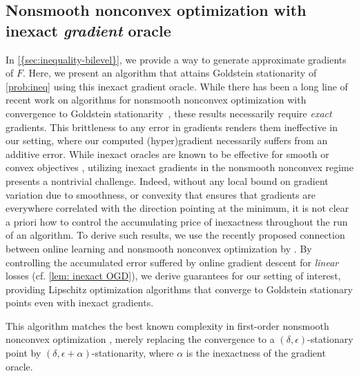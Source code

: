 \subsection{Nonsmooth nonconvex optimization with inexact \emph{gradient}  oracle}
In \cref{{sec:inequality-bilevel}}, we provide a way to generate approximate gradients of $F$. Here, we present an algorithm that attains Goldstein stationarity of \cref{prob:ineq} using this inexact gradient oracle.  While there has been a long line of recent work on algorithms for nonsmooth nonconvex optimization with convergence to Goldstein stationarity~\cite{zhang2020complexity, davis2022gradient, jordan2023deterministic, kong2023cost, grimmer2023goldstein}, these results necessarily require \textit{exact} gradients. 
This brittleness to any error in gradients renders them ineffective in our setting, where our computed (hyper)gradient necessarily suffers from an
additive error.
While inexact oracles are known to be effective for smooth or convex objectives \citep{devolder2014first}, utilizing inexact gradients in the nonsmooth nonconvex regime presents a nontrivial challenge.
Indeed, without any local bound on gradient variation due to smoothness, or convexity that ensures that gradients are everywhere correlated with the direction pointing at the minimum, it is not clear a priori how to control the accumulating price of inexactness throughout the run of an algorithm.
To derive such results, we  use the recently proposed connection between online learning and nonsmooth nonconvex optimization by \citet{cutkosky2023optimal}. By controlling the accumulated error suffered by online gradient descent for \emph{linear} losses (cf. \cref{lem: inexact OGD}), 
we derive guarantees for our setting of interest, providing Lipschitz optimization algorithms that converge to Goldstein stationary points even with inexact gradients.  


This algorithm matches the best known complexity in first-order nonsmooth nonconvex optimization \cite{zhang2020complexity,davis2022gradient,cutkosky2023optimal}, merely replacing the convergence to a $(\delta,\epsilon)$-stationary point by $(\delta,\epsilon+\alpha)$-stationarity, where $\alpha$ is the inexactness of the gradient oracle.

